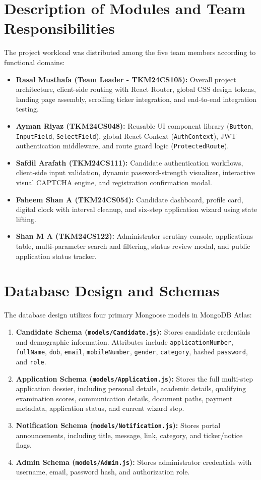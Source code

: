 \documentclass[12pt,a4paper,oneside]{report}
\begin{document}
\section{Description of Modules and Team Responsibilities}
The project workload was distributed among the five team members according to functional domains:
\begin{itemize}
    \item \textbf{Rasal Musthafa (Team Leader - TKM24CS105):} Overall project architecture, client-side routing with React Router, global CSS design tokens, landing page assembly, scrolling ticker integration, and end-to-end integration testing.
    \item \textbf{Ayman Riyaz (TKM24CS048):} Reusable UI component library (\texttt{Button}, \texttt{InputField}, \texttt{SelectField}), global React Context (\texttt{AuthContext}), JWT authentication middleware, and route guard logic (\texttt{ProtectedRoute}).
    \item \textbf{Safdil Arafath (TKM24CS111):} Candidate authentication workflows, client-side input validation, dynamic password-strength visualizer, interactive visual CAPTCHA engine, and registration confirmation modal.
    \item \textbf{Faheem Shan A (TKM24CS054):} Candidate dashboard, profile card, digital clock with interval cleanup, and six-step application wizard using state lifting.
    \item \textbf{Shan M A (TKM24CS122):} Administrator scrutiny console, applications table, multi-parameter search and filtering, status review modal, and public application status tracker.
\end{itemize}

\section{Database Design and Schemas}
The database design utilizes four primary Mongoose models in MongoDB Atlas:
\begin{enumerate}
    \item \textbf{Candidate Schema (\texttt{models/Candidate.js}):} Stores candidate credentials and demographic information. Attributes include \texttt{applicationNumber}, \texttt{fullName}, \texttt{dob}, \texttt{email}, \texttt{mobileNumber}, \texttt{gender}, \texttt{category}, hashed \texttt{password}, and \texttt{role}.
    \item \textbf{Application Schema (\texttt{models/Application.js}):} Stores the full multi-step application dossier, including personal details, academic details, qualifying examination scores, communication details, document paths, payment metadata, application status, and current wizard step.
    \item \textbf{Notification Schema (\texttt{models/Notification.js}):} Stores portal announcements, including title, message, link, category, and ticker/notice flags.
    \item \textbf{Admin Schema (\texttt{models/Admin.js}):} Stores administrator credentials with username, email, password hash, and authorization role.
\end{enumerate}
\end{document}
